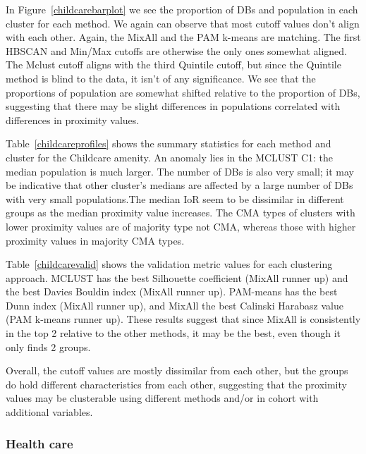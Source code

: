 \documentclass[11pt, a4paper]{article}
\begin{document}
In Figure~\ref{childcarebarplot} we see the proportion of DBs and population in each cluster for each method. We again can observe that most cutoff values don’t align with each other. Again, the MixAll and the PAM k-means are matching. The first HBSCAN and Min/Max cutoffs are otherwise the only ones somewhat aligned. The Mclust cutoff aligns with the third Quintile cutoff, but since the Quintile method is blind to the data, it isn’t of any significance. We see that the proportions of population are somewhat shifted relative to the proportion of DBs, suggesting that there may be slight differences in populations correlated with differences in proximity values.
\par
Table~\ref{childcareprofiles} shows the summary statistics for each method and cluster for the Childcare amenity. An anomaly lies in the MCLUST C1: the median population is much larger. The number of DBs is also very small; it may be indicative that other cluster’s medians are affected by a large number of DBs with very small populations.The median IoR seem to be dissimilar in different groups as the median proximity value increases. The CMA types of clusters with lower proximity values are of majority type not CMA, whereas those with higher proximity values in majority CMA types.
\par
Table~\ref{childcarevalid} shows the validation metric values for each clustering approach. MCLUST has the best Silhouette coefficient (MixAll runner up) and the best Davies Bouldin index (MixAll runner up).  PAM-means has the best Dunn index (MixAll runner up), and MixAll the best Calinski Harabasz value (PAM k-means runner up). These results suggest that since MixAll is consistently in the top 2 relative to the other methods, it may be the best, even though it only finds 2 groups.
\par
Overall, the cutoff values are mostly dissimilar from each other, but the groups do hold different characteristics from each other, suggesting that the proximity values may be clusterable using different methods and/or in cohort with additional variables.



\subsubsection{Health care}
\end{document}

